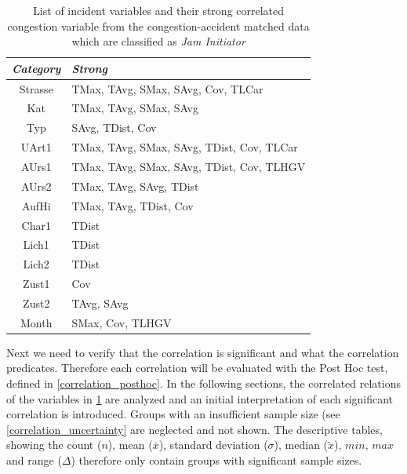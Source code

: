 \begin{table}[ht]
	\centering
	\begin{tabular}{c|l}  
		\toprule
		\textit{Category} & \textit{Strong} \\
		\midrule
		Strasse & TMax, TAvg, SMax, SAvg, Cov, TLCar \\ 
 		Kat & TMax, TAvg, SMax, SAvg \\ %
 		Typ & SAvg, TDist, Cov \\  %
 		UArt1 & TMax, TAvg, SMax, SAvg, TDist, Cov, TLCar \\
 		AUrs1 & TMax, TAvg, SMax, SAvg, TDist, Cov, TLHGV \\ %
 		AUrs2 & TMax, TAvg, SAvg, TDist \\
 		AufHi & TMax, TAvg, TDist, Cov \\
 		Char1 & TDist \\ %
 		Lich1 & TDist \\
 		Lich2 & TDist \\ %
 		Zust1 & Cov \\
 		Zust2 & TAvg, SAvg \\ %
 		Month & SMax, Cov, TLHGV \\ %
 		\bottomrule
	\end{tabular}
	\caption{List of incident variables and their strong correlated congestion variable from the congestion-accident matched data which are classified as \textit{Jam Initiator}}
	\label{tbl:correlation_list_baysis_initiator}
\end{table}
Next we need to verify that the correlation is significant and what the correlation predicates. Therefore each correlation will be evaluated with the Post Hoc test, defined in \cref{correlation_posthoc}. In the following sections, the correlated relations of the variables in \cref{tbl:correlation_list_baysis_initiator} are analyzed and an initial interpretation of each significant correlation is introduced. Groups with an insufficient sample size (see \cref{correlation_uncertainty} are neglected and not shown. The descriptive tables, showing the count ($n$), mean ($\bar{x}$), standard deviation ($\sigma$), median ($\tilde{x}$), $min$, $max$ and range ($\Delta$) therefore only contain groups with significant sample sizes.
